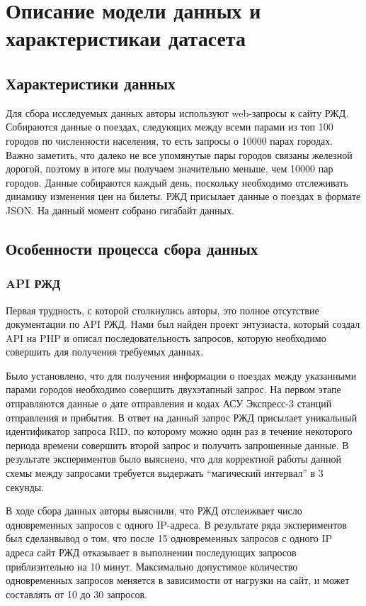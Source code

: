 \documentclass[conference]{IEEEtran}
\begin{document}
\section{Описание модели данных и характеристикаи датасета}
\subsection{Характеристики данных}

Для сбора исследуемых данных авторы используют web-запросы к сайту РЖД. Собираются данные о поездах, следующих между всеми парами из топ 100 городов по численности населения, то есть запросы о 10000 парах городах. Важно заметить, что далеко не все упомянутые пары городов связаны железной дорогой, поэтому в итоге мы получаем значительно меньше, чем 10000 пар городов. Данные собираются каждый день, поскольку необходимо отслеживать динамику изменения цен на билеты. РЖД присылает данные о поездах в формате JSON. На данный момент собрано %
гигабайт данных.

\subsection{Особенности процесса сбора данных}

\subsubsection{API РЖД}
Первая трудность, с которой столкнулись авторы, это полное отсутствие документации по API РЖД. Нами был найден проект энтузиаста, который создал API на PHP и описал последовательность запросов, которую необходимо совершить для получения требуемых данных. %

Было установлено, что для получения информации о поездах между указанными парами городов необходимо совершить двухэтапный запрос. На первом этапе отправляются данные о дате отправления и кодах АСУ Экспресс-3 станций отправления и прибытия. В ответ на данный запрос РЖД присылает уникальный идентификатор запроса RID, по которому можно один раз в течение некоторого периода времени совершить второй запрос и получить запрошенные данные. В результате экспериментов было выяснено, что для корректной работы данной схемы между запросами требуется выдержать ``магический интервал'' в 3 секунды.

В ходе сбора данных авторы выяснили, что РЖД отслеижвает число одновременных запросов с одного IP-адреса. В результате ряда экспериментов был сделанвывод о том, что после 15 одновременных запросов с одного IP адреса сайт РЖД отказывает в выполнении последующих запросов приблизительно на 10 минут. Максимально допустимое количество одновременных запросов меняется в зависимости от нагрузки на сайт, и может составлять от 10 до 30 запросов.
\end{document}
